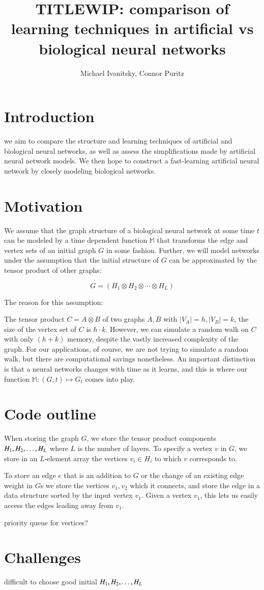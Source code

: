 \documentclass{article}
\date{}
\title{TITLE}
\author{Michael Ivanitsky, Connor Puritz}
\title{WIP: comparison of learning techniques in artificial vs biological neural networks}
\newcommand{\tensProd}{\otimes}
\newcommand{\M}{\mathbb{M}}
\begin{document}
\maketitle


\section{Introduction}

we aim to compare the structure and learning techniques of artificial and biological neural networks, as well as assess the simplifications made by artificial neural network models. We then hope to construct a fast-learning artificial neural network by closely modeling biological networks.


\section{Motivation}

We assume that the graph structure of a biological neural network at some time $t$ can be modeled by a time dependent function $\M$ that transforms the edge and vertex sets of an initial graph $G$ in some fashion. Further, we will model networks under the assumption that the initial structure of $G$ can be approximated by the tensor product of other graphs:

$$ G = (H_1 \tensProd H_2 \tensProd \cdots \tensProd H_L ) $$

The reason for this assumption:

The tensor product $ C = A \otimes B$ of two graphs $A,B$ with $|V_A| = h, |V_B| = k$, the size of the vertex set of $C$ is $h \cdot k$. However, we can simulate a random walk on $C$ with only $(h + k)$ memory, despite the vastly increased complexity of the graph. For our applications, of course, we are not trying to simulate a random walk, but there are computational savings nonetheless. An important distinction is that a neural networks changes with time as it learns, and this is where our function $\M : (G, t) \mapsto G_t$ comes into play.


\section{Code outline}

When storing the graph $G$, we store the tensor product components $H_1, H_2, \ldots, H_{L}$ where $L$ is the number of layers. To specify a vertex $v$ in $G$, we store in an $L$-element array the vertices $v_i \in H_i$ to which $v$ corresponds to.

To store an edge $e$ that is an addition to $G$ or the change of an existing edge weight in $G$s we store the vertices $v_1, v_2$ which it connects, and store the edge in a data structure sorted by the input vertex $v_1$. Given a vertex $v_1$, this lets us easily access the edges leading away from $v_1$.



priority queue for vertices?


\section{Challenges}

difficult to choose good initial $H_1, H_2, \ldots, H_{L}$
\end{document}
